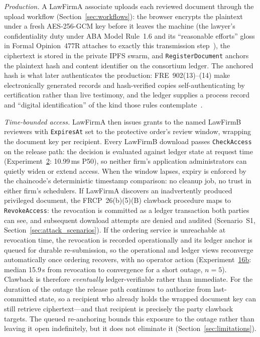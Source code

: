 \documentclass[preprint,12pt]{elsarticle}
\begin{document}
\emph{Production.} A LawFirmA associate uploads each reviewed document
through the upload workflow
(Section~\ref{sec:workflows}): the browser encrypts the
plaintext under a fresh AES-256-GCM key before it leaves the machine
(the lawyer's confidentiality duty under ABA Model Rule~1.6 and its
``reasonable efforts'' gloss in Formal Opinion~477R attaches to
exactly this transmission step~\cite{aba477r}), the ciphertext is
stored in the private IPFS swarm, and \texttt{RegisterDocument}
anchors the plaintext hash and content identifier on the consortium
ledger. The anchored hash is what later authenticates the production:
FRE~902(13)--(14) make electronically generated records and
hash-verified copies self-authenticating by certification rather than
live testimony, and the ledger supplies a process record and ``digital
identification'' of the kind those rules
contemplate~\cite{fre902}.

\emph{Time-bounded access.} LawFirmA then issues grants to the named
LawFirmB reviewers with \texttt{ExpiresAt} set to the protective
order's review window, wrapping the document key per recipient. Every
LawFirmB download passes \texttt{CheckAccess} on the release path: the
decision is evaluated against ledger state at request time
(Experiment~\hyperref[sec:exp_latency]{2}: 10.99\,ms P50), so neither
firm's application administrators can quietly widen or extend access.
When the window lapses, expiry is enforced by the chaincode's
deterministic timestamp comparison: no cleanup job, no trust in
either firm's schedulers. If LawFirmA discovers an inadvertently
produced privileged document, the FRCP~26(b)(5)(B) clawback procedure
maps to \texttt{RevokeAccess}: the revocation is committed as a ledger
transaction both parties can see, and subsequent download attempts are
denied and audited (Scenario~S1, Section~\ref{sec:attack_scenarios}).
If the ordering service is unreachable at revocation time, the
revocation is recorded operationally and its ledger anchor is queued
for durable re-submission, so the operational and ledger views
reconverge automatically once ordering recovers, with no operator
action (Experiment~\hyperref[sec:exp_orderer_reconcile]{16b}: median
15.9\,s from revocation to convergence for a short outage, $n=5$).
Clawback is therefore \emph{eventually} ledger-verifiable rather than
immediate. For the duration of the outage the release path continues
to authorize from last-committed state, so a recipient who already
holds the wrapped document key can still retrieve ciphertext---and
that recipient is precisely the party clawback targets. The queued
re-anchoring bounds this exposure to the outage rather than leaving it
open indefinitely, but it does not eliminate it
(Section~\ref{sec:limitations}).
\end{document}

